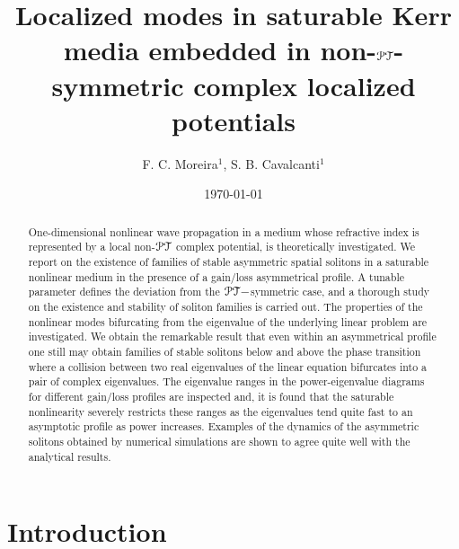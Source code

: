 \documentclass[aps,pre,showpacs,twocolumn]{revtex4}
\newcommand{\PT}{{\cal PT}}
\begin{document}
\title{Localized modes in saturable Kerr media embedded in non-$\PT$-symmetric complex localized potentials}

\author{F. C. Moreira$^{1}$, S. B. Cavalcanti$^{1}$ }


\date{\today}

\begin{abstract}
One-dimensional nonlinear wave propagation in a medium whose  refractive index is represented by a local non-${\cal PT}$ complex  potential, is theoretically investigated. We report on the existence of families of stable asymmetric spatial solitons in a saturable nonlinear medium in the presence of a gain/loss asymmetrical profile.  A tunable parameter defines the deviation from the ${\cal PT}- $symmetric case, and a thorough study on the existence and stability of soliton families is carried out. The properties of the nonlinear modes bifurcating  from the eigenvalue of the underlying linear problem are investigated. We obtain the remarkable result that even within an asymmetrical profile one still may obtain families of stable solitons below and above the phase transition where a collision between two real eigenvalues of the linear equation bifurcates into a pair of complex eigenvalues. The eigenvalue ranges in the power-eigenvalue diagrams  for different gain/loss profiles are inspected and, it is found that the saturable nonlinearity severely restricts these ranges as the eigenvalues tend quite fast to an asymptotic profile as power increases. Examples of the dynamics of the asymmetric solitons obtained by numerical simulations are shown to agree quite well with the analytical results.
\end{abstract}
\maketitle

%


\section{Introduction}
\end{document}
